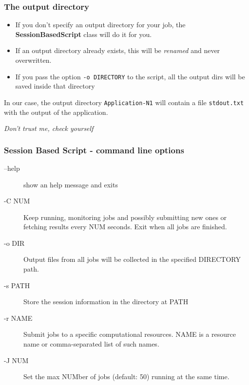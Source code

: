 \documentclass[english,serif,mathserif,xcolor=pdftex,dvipsnames,table]{beamer}
\begin{document}
\begin{frame}[fragile]
  \frametitle{The output directory}
  \begin{itemize}
  \item If you don't specify an output directory for your job, the
    \textbf{SessionBasedScript} class will do it for you.
  \item If an output directory already exists, this will be
    \textit{renamed} and never overwritten.
  \item If you pass the option \lstinline|-o DIRECTORY| to the script,
    all the output dirs will be saved inside that directory
  \end{itemize}

  In our case, the output directory \lstinline|Application-N1| will
  contain a file \lstinline|stdout.txt| with the output of the
  application.

  \pause\+
  \centering\textit{Don't trust me, check yourself}

\end{frame}

\begin{frame}
  \frametitle{Session Based Script - command line options}
  \begin{description}
  \item[--help] show an help message and exits
  \item[-C NUM] Keep running, monitoring jobs and possibly submitting
    new ones or fetching results every NUM seconds. Exit when all jobs
    are finished.
  \item[-o DIR] Output files from all jobs will be collected in the
    specified DIRECTORY path.
  \item[-s PATH] Store the session information in the directory at
    PATH
  \item[-r NAME] Submit jobs to a specific computational resources.
    NAME is a resource name or comma-separated list of such names. 
  \item[-J NUM] Set the max NUMber of jobs (default: 50) running at
    the same time.

  \end{description}
\end{frame}
\end{document}
